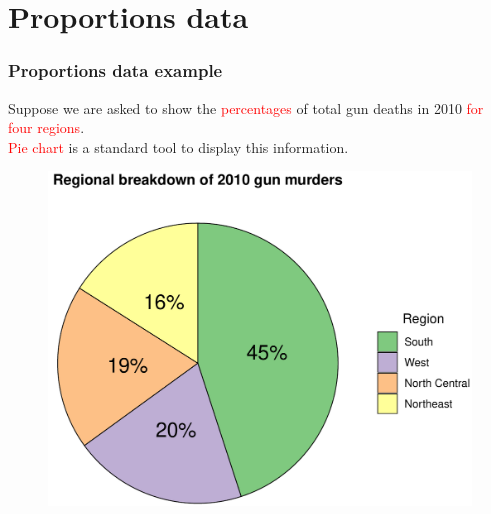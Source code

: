 \documentclass{beamer}
\begin{document}
\section{Proportions data}
\begin{frame}[t]\frametitle{Proportions data example}
{\small Suppose we are asked to show the \textcolor{red}{percentages} of total gun deaths in 2010 \textcolor{red}{for four regions}.\\
\textcolor{red}{Pie chart} is a standard tool to display this information.}
\begin{figure}
\includegraphics[width=0.80\linewidth]{PlotsLec1/PieMurders2}
\end{figure}
\end{frame}
\end{document}
